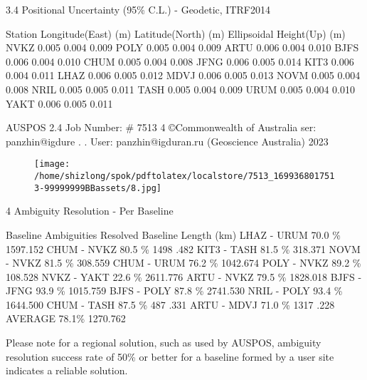 \documentclass[a4paper,12pt]{article}
\begin{document}
\vspace{10pt}

    3.4 Positional Uncertainty (95\% C.L.) - Geodetic, ITRF2014 

\vspace{10pt}

         Station Longitude(East) (m) Latitude(North) (m)  Ellipsoidal Height(Up) (m)                   NVKZ 0.005 0.004 0.009  POLY 0.005 0.004 0.009  ARTU 0.006 0.004 0.010  BJFS 0.006 0.004 0.010  CHUM 0.005 0.004 0.008  JFNG 0.006 0.005 0.014  KIT3 0.006 0.004 0.011  LHAZ 0.006 0.005 0.012  MDVJ 0.006 0.005 0.013  NOVM 0.005 0.004 0.008  NRIL 0.005 0.005 0.011  TASH 0.005 0.004 0.009  URUM 0.005 0.004 0.010  YAKT 0.006 0.005 0.011     

\vspace{10pt}

         AUSPOS 2.4 Job Number: \# 7513 4 ©Commonwealth of Australia    ser: panzhin@igdure . .  User: panzhin@igduran.ru (Geoscience Australia) 2023 

\vspace{10pt}

\par

\vspace{10pt}

\begin{figure}[h]

\texttt{[image: /home/shizlong/spok/pdftolatex/localstore/7513\_1699368017513-99999999BBassets/8.jpg]}

\centering

\end{figure}

    4 Ambiguity Resolution - Per Baseline 

\vspace{10pt}

                        Baseline Ambiguities Resolved Baseline Length (km)  LHAZ - URUM 70.0 \% 1597.152  CHUM - NVKZ 80.5 \% 1498 .482  KIT3 - TASH 81.5 \% 318.371  NOVM - NVKZ 81.5 \% 308.559  CHUM - URUM 76.2 \% 1042.674  POLY - NVKZ 89.2 \% 108.528  NVKZ - YAKT 22.6 \% 2611.776  ARTU - NVKZ 79.5 \% 1828.018  BJFS - JFNG 93.9 \% 1015.759  BJFS - POLY 87.8 \% 2741.530  NRIL - POLY 93.4 \% 1644.500  CHUM - TASH 87.5 \% 487 .331  ARTU - MDVJ 71.0 \% 1317 .228  AVERAGE 78.1\% 1270.762     

\vspace{10pt}

    Please note for a regional solution, such as used by AUSPOS, ambiguity resolution success  rate of 50\% or better for a baseline formed by a user site indicates a reliable solution. 
\end{document}
